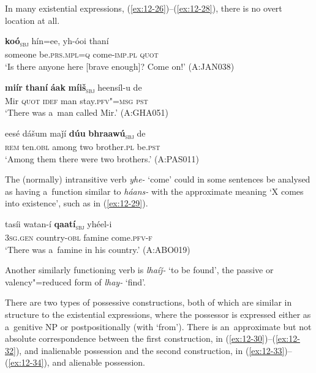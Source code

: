 In many existential expressions, (\ref{ex:12-26})--(\ref{ex:12-28}), there is no overt location at all.

\begin{exe}
\ex
\label{ex:12-26}
\gll {\ob}\textbf{koó}{\cb}\textsubscript{\textsc{\upshape sbj}} hín=ee, yh-óoi thaní \\
someone be.\textsc{prs.mpl}=\textsc{q} come-\textsc{imp.pl} \textsc{quot} \\
\glt `Is there anyone here [brave enough]? Come on!' (A:JAN038)
\end{exe}
\begin{exe}
\ex
\label{ex:12-27}
\gll {\ob}\textbf{miír} \textbf{thaní} \textbf{áak} \textbf{míiš}{\cb}\textsubscript{\textsc{\upshape sbj}} heensíl-u de \\
Mir \textsc{quot} \textsc{idef} man stay.\textsc{pfv"=msg} \textsc{pst} \\
\glt `There was a~man called Mir.' (A:GHA051)
\end{exe}
\begin{exe}
\ex
\label{ex:12-28}
\gll eesé dášum maǰí {\ob}\textbf{dúu} \textbf{bhraawú}{\cb}\textsubscript{\textsc{\upshape sbj}} de\\
\textsc{rem} ten.\textsc{obl} among two brother.\textsc{pl} be.\textsc{pst}\\
\glt `Among them there were two brothers.' (A:PAS011)
\end{exe}

The (normally) intransitive verb \textit{yhe-} `come' could in some sentences be analysed as having a~function similar to \textit{háans-} with the approximate meaning `X comes into existence', such as in (\ref{ex:12-29}).

\begin{exe}
\ex
\label{ex:12-29}
\gll tasíi watan-í {\ob}\textbf{qaatí}{\cb}\textsubscript{\textsc{\upshape sbj}} yhéel-i \\
\textsc{3sg.gen} country-\textsc{obl} famine come.\textsc{pfv-f} \\
\glt `There was a~famine in his country.' (A:ABO019)
\end{exe}

Another similarly functioning verb is \textit{lhaíǰ-} `to be found', the passive or valency"=reduced form of \textit{lhay-} `find'.


 There are two types of possessive constructions, both of which are similar in structure to the existential expressions, where the possessor is expressed either as a~genitive NP or postpositionally (with `from'). There is an~approximate but not absolute correspondence between the first construction, in (\ref{ex:12-30})--(\ref{ex:12-32}), and inalienable possession and the second construction, in (\ref{ex:12-33})--(\ref{ex:12-34}), and alienable possession.


